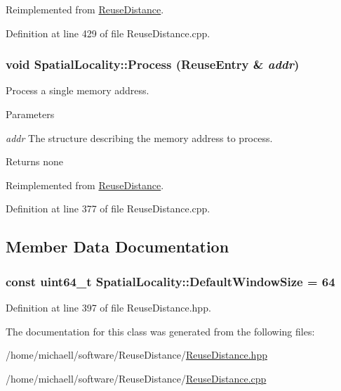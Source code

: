 Reimplemented from \hyperlink{class_reuse_distance_acc4885040a8a518fc10b5aa4da7d777a}{ReuseDistance}.



Definition at line 429 of file ReuseDistance.cpp.

\hypertarget{class_spatial_locality_a72a96a67e1791851927dbf3e5ceb206f}{
\subsubsection[{Process}]{\setlength{\rightskip}{0pt plus 5cm}void SpatialLocality::Process ({\bf ReuseEntry} \& {\em addr})}}
\label{class_spatial_locality_a72a96a67e1791851927dbf3e5ceb206f}
Process a single memory address.


\begin{DoxyParams}{Parameters}
\item[{\em addr}]The structure describing the memory address to process.\end{DoxyParams}
\begin{DoxyReturn}{Returns}
none 
\end{DoxyReturn}


Reimplemented from \hyperlink{class_reuse_distance_a4ff6b77022ce62e0fdefa5cc297b932a}{ReuseDistance}.



Definition at line 377 of file ReuseDistance.cpp.



\subsection{Member Data Documentation}
\hypertarget{class_spatial_locality_a563aa890ea539ae76c942fd1827a3095}{
\subsubsection[{DefaultWindowSize}]{\setlength{\rightskip}{0pt plus 5cm}const uint64\_\-t {\bf SpatialLocality::DefaultWindowSize} = 64}}
\label{class_spatial_locality_a563aa890ea539ae76c942fd1827a3095}


Definition at line 397 of file ReuseDistance.hpp.



The documentation for this class was generated from the following files:\begin{DoxyCompactItemize}
\item 
/home/michaell/software/ReuseDistance/\hyperlink{_reuse_distance_8hpp}{ReuseDistance.hpp}\item 
/home/michaell/software/ReuseDistance/\hyperlink{_reuse_distance_8cpp}{ReuseDistance.cpp}\end{DoxyCompactItemize}
